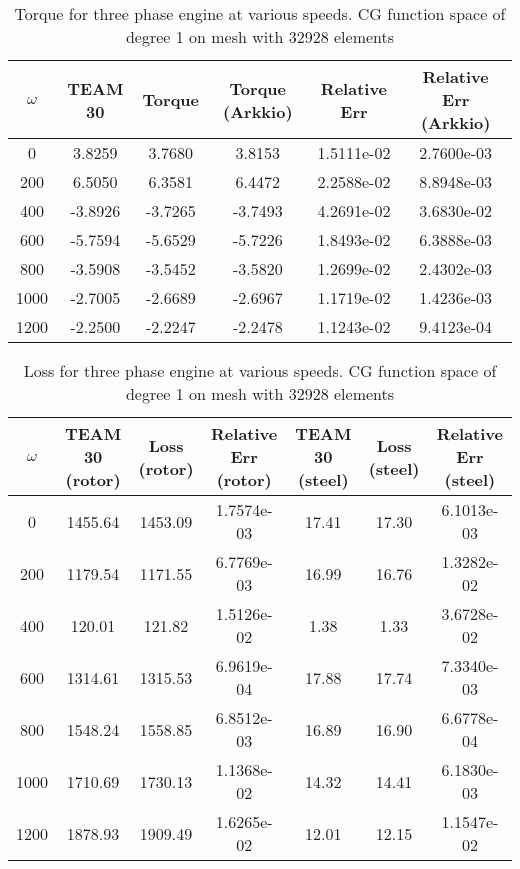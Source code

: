 \begin{table}[!ht]
\centering
\caption{Torque for three phase engine at various speeds. CG function space of degree 1 on mesh with 32928 elements}
\label{tab:torque:three}
\begin{tabular}{cccccc}
\toprule
$\omega$ & TEAM 30 &  Torque & Torque (Arkkio) & Relative Err & Relative Err (Arkkio) \\
\midrule
       0 &  3.8259 &  3.7680 &          3.8153 &   1.5111e-02 &            2.7600e-03 \\
     200 &  6.5050 &  6.3581 &          6.4472 &   2.2588e-02 &            8.8948e-03 \\
     400 & -3.8926 & -3.7265 &         -3.7493 &   4.2691e-02 &            3.6830e-02 \\
     600 & -5.7594 & -5.6529 &         -5.7226 &   1.8493e-02 &            6.3888e-03 \\
     800 & -3.5908 & -3.5452 &         -3.5820 &   1.2699e-02 &            2.4302e-03 \\
    1000 & -2.7005 & -2.6689 &         -2.6967 &   1.1719e-02 &            1.4236e-03 \\
    1200 & -2.2500 & -2.2247 &         -2.2478 &   1.1243e-02 &            9.4123e-04 \\
\bottomrule
\end{tabular}
\end{table}


\begin{table}[!ht]
\centering
\caption{Loss for three phase engine at various speeds. CG function space of degree 1 on mesh with 32928 elements}
\label{tab:loss:three}
\begin{tabular}{ccccccc}
\toprule
$\omega$ & TEAM 30 (rotor) & Loss (rotor) & Relative Err (rotor) & TEAM 30 (steel) & Loss (steel) & Relative Err (steel) \\
\midrule
       0 &         1455.64 &      1453.09 &           1.7574e-03 &           17.41 &        17.30 &           6.1013e-03 \\
     200 &         1179.54 &      1171.55 &           6.7769e-03 &           16.99 &        16.76 &           1.3282e-02 \\
     400 &          120.01 &       121.82 &           1.5126e-02 &            1.38 &         1.33 &           3.6728e-02 \\
     600 &         1314.61 &      1315.53 &           6.9619e-04 &           17.88 &        17.74 &           7.3340e-03 \\
     800 &         1548.24 &      1558.85 &           6.8512e-03 &           16.89 &        16.90 &           6.6778e-04 \\
    1000 &         1710.69 &      1730.13 &           1.1368e-02 &           14.32 &        14.41 &           6.1830e-03 \\
    1200 &         1878.93 &      1909.49 &           1.6265e-02 &           12.01 &        12.15 &           1.1547e-02 \\
\bottomrule
\end{tabular}
\end{table}

